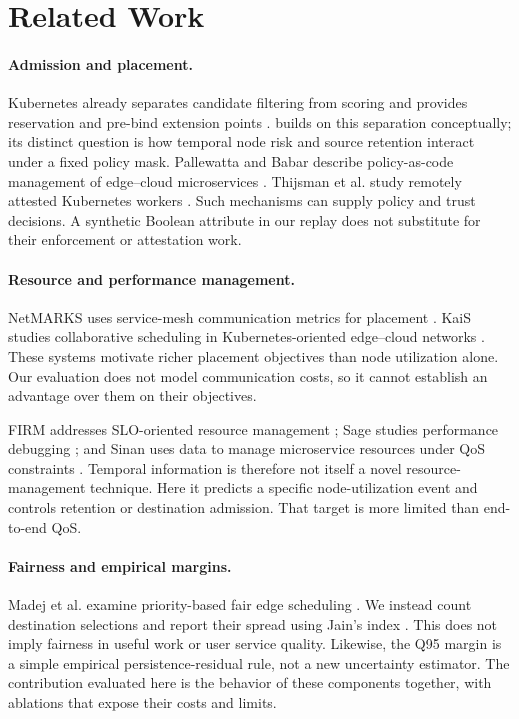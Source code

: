 \section{Related Work}\label{sec:related}
\paragraph{Admission and placement.}
Kubernetes already separates candidate filtering from scoring and provides
reservation and pre-bind extension points \citep{kubernetes2026}.
\cage builds on this separation conceptually; its distinct question is how
temporal node risk and source retention interact under a fixed policy mask.
Pallewatta and Babar describe policy-as-code management of edge--cloud
microservices \citep{pallewatta2024policy}. Thijsman et al. study remotely
attested Kubernetes workers \citep{thijsman2024attested}. Such mechanisms
can supply policy and trust decisions. A synthetic Boolean attribute in
our replay does not substitute for their enforcement or attestation work.

\paragraph{Resource and performance management.}
NetMARKS uses service-mesh communication metrics for placement
\citep{wojciechowski2021netmarks}. KaiS studies collaborative scheduling in
Kubernetes-oriented edge--cloud networks \citep{shen2023kais}. These systems
motivate richer placement objectives than node utilization alone. Our
evaluation does not model communication costs, so it cannot establish an
advantage over them on their objectives.

FIRM addresses SLO-oriented resource management \citep{qiu2020firm}; Sage
studies performance debugging \citep{gan2021sage}; and Sinan uses data to
manage microservice resources under QoS constraints \citep{zhang2021sinan}.
Temporal information is therefore not itself a novel resource-management
technique. Here it predicts a specific node-utilization event and controls
retention or destination admission. That target is more limited than
end-to-end QoS.

\paragraph{Fairness and empirical margins.}
Madej et al. examine priority-based fair edge scheduling
\citep{madej2020fair}. We instead count destination selections and report
their spread using Jain's index \citep{jain1984fairness}. This does not imply
fairness in useful work or user service quality. Likewise, the Q95 margin
is a simple empirical persistence-residual rule, not a new uncertainty
estimator. The contribution evaluated here is the behavior of these
components together, with ablations that expose their costs and limits.
